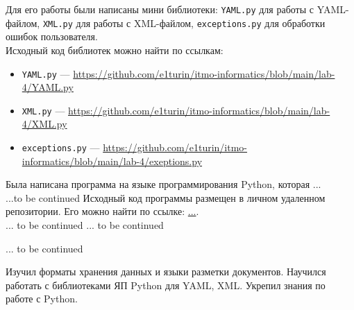 Для его работы были написаны мини библиотеки: \texttt{YAML.py} для работы с YAML-файлом, \texttt{XML.py} для работы с XML-файлом, \texttt{exсeptions.py} для обработки ошибок пользователя.\\
Исходный код библиотек можно найти по ссылкам: 
\begin{itemize}
    \item \texttt{YAML.py} ---  \url{https://github.com/e1turin/itmo-informatics/blob/main/lab-4/YAML.py}
    
    \item \texttt{XML.py} --- \url{https://github.com/e1turin/itmo-informatics/blob/main/lab-4/XML.py}
    
    \item \texttt{exсeptions.py} --- \url{https://github.com/e1turin/itmo-informatics/blob/main/lab-4/exeptions.py}
\end{itemize}


Была написана программа на языке программирования Python, которая ...\\
...to be continued
Исходный код программы размещен в личном удаленном репозитории. Его можно найти по ссылке: \url{...}.\\ 

... to be continued
... to be continued

... to be continued

Изучил форматы хранения данных и языки разметки документов. Научился работать с библиотеками ЯП Python для YAML, XML. Укрепил знания по работе с Python.\\
\newpage







